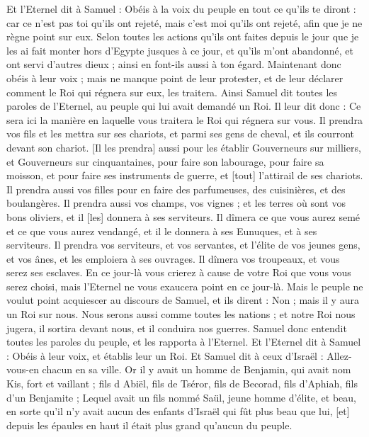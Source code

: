 \begin{multicols}{2}
Et l'Eternel dit à Samuel : Obéis à la voix du peuple en tout ce qu'ils te diront : car ce n'est pas toi qu'ils ont rejeté, mais c'est moi qu'ils ont rejeté, afin que je ne règne point sur eux.
Selon toutes les actions qu'ils ont faites depuis le jour que je les ai fait monter hors d'Egypte jusques à ce jour, et qu'ils m'ont abandonné, et ont servi d'autres dieux ; ainsi en font-ils aussi à ton égard.
Maintenant donc obéis à leur voix ; mais ne manque point de leur protester, et de leur déclarer comment le Roi qui régnera sur eux, les traitera.
Ainsi Samuel dit toutes les paroles de l'Eternel, au peuple qui lui avait demandé un Roi.
Il leur dit donc : Ce sera ici la manière en laquelle vous traitera le Roi qui régnera sur vous. Il prendra vos fils et les mettra sur ses chariots, et parmi ses gens de cheval, et ils courront devant son chariot.
[Il les prendra] aussi pour les établir Gouverneurs sur milliers, et Gouverneurs sur cinquantaines, pour faire son labourage, pour faire sa moisson, et pour faire ses instruments de guerre, et [tout] l'attirail de ses chariots.
Il prendra aussi vos filles pour en faire des parfumeuses, des cuisinières, et des boulangères.
Il prendra aussi vos champs, vos vignes ; et les terres où sont vos bons oliviers, et il [les] donnera à ses serviteurs.
Il dîmera ce que vous aurez semé et ce que vous aurez vendangé, et il le donnera à ses Eunuques, et à ses serviteurs.
Il prendra vos serviteurs, et vos servantes, et l'élite de vos jeunes gens, et vos ânes, et les emploiera à ses ouvrages.
Il dîmera vos troupeaux, et vous serez ses esclaves.
En ce jour-là vous crierez à cause de votre Roi que vous vous serez choisi, mais l'Eternel ne vous exaucera point en ce jour-là.
Mais le peuple ne voulut point acquiescer au discours de Samuel, et ils dirent : Non ; mais il y aura un Roi sur nous.
Nous serons aussi comme toutes les nations ; et notre Roi nous jugera, il sortira devant nous, et il conduira nos guerres.
Samuel donc entendit toutes les paroles du peuple, et les rapporta à l'Eternel.
Et l'Eternel dit à Samuel : Obéis à leur voix, et établis leur un Roi. Et Samuel dit à ceux d'Israël : Allez-vous-en chacun en sa ville.
\VerseOne{}Or il y avait un homme de Benjamin, qui avait nom Kis, fort et vaillant ; fils d Abiël, fils de Tséror, fils de Becorad, fils d'Aphiah, fils d'un Benjamite ;
Lequel avait un fils nommé Saül, jeune homme d'élite, et beau, en sorte qu'il n'y avait aucun des enfants d'Israël qui fût plus beau que lui, [et] depuis les épaules en haut il était plus grand qu'aucun du peuple.

\end{multicols}
